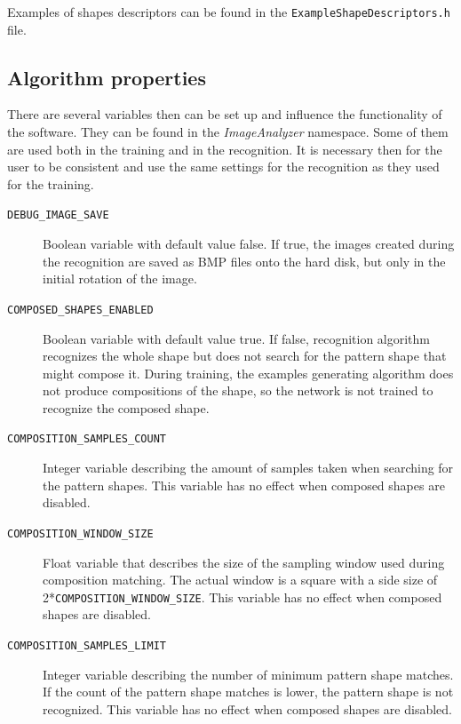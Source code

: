 Examples of shapes descriptors can be found in the \texttt{ExampleShapeDescriptors.h} file.

\subsection{Algorithm properties}
There are several variables then can be set up and influence the functionality of the software. They can be found in the \emph{ImageAnalyzer} namespace. Some of them are used both in the training and in the recognition. It is necessary then for the user to be consistent and use the same settings for the recognition as they used for the training.

\begin{description}
\item[\texttt{DEBUG\_IMAGE\_SAVE}] Boolean variable with default value false. If true, the images created during the recognition are saved as BMP files onto the hard disk, but only in the initial rotation of the image.

\item[\texttt{COMPOSED\_SHAPES\_ENABLED}] Boolean variable with default value true. If false, recognition algorithm recognizes the whole shape but does not search for the pattern shape that might compose it. During training, the examples generating algorithm does not produce compositions of the shape, so the network is not trained to recognize the composed shape.

\item[\texttt{COMPOSITION\_SAMPLES\_COUNT}] Integer variable describing the amount of samples taken when searching for the pattern shapes. This variable has no effect when composed shapes are disabled.

\item[\texttt{COMPOSITION\_WINDOW\_SIZE}] Float variable that describes the size of the sampling window used during composition matching. The actual window is a square with a side size of 2*\texttt{COMPOSITION\_WINDOW\_SIZE}. This variable has no effect when composed shapes are disabled.

\item[\texttt{COMPOSITION\_SAMPLES\_LIMIT}] Integer variable describing the number of minimum pattern shape matches. If the count of the pattern shape matches is lower, the pattern shape is not recognized. This variable has no effect when composed shapes are disabled.


\end{description}
